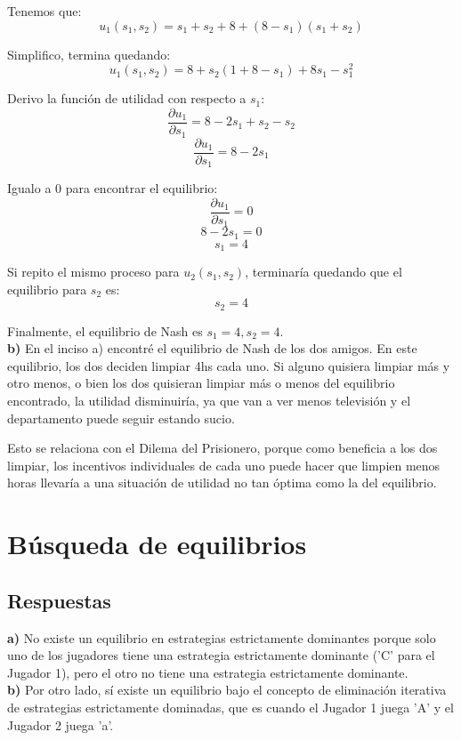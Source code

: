 \documentclass{article}
\begin{document}
                Tenemos que:
                \[u_{1}(s_{1},s_{2}) = s_{1}+s_{2}+8+(8-s_{1})(s_{1}+s_{2})\]

                Simplifico, termina quedando:
                \[u_{1}(s_{1},s_{2}) = 8 + s_{2}(1+8-s_{1})+8s_{1}-s^{2}_{1}\]

                Derivo la función de utilidad con respecto a $s_{1}$:
                \[\frac{\partial u_{1}}{\partial s_{1}} = 8 - 2s_{1} + s_{2}-s_{2}\]
                \[\frac{\partial u_{1}}{\partial s_{1}} = 8 - 2s_{1}\]

                Igualo a 0 para encontrar el equilibrio:
                \[\frac{\partial u_{1}}{\partial s_{1}} = 0\]
                \[8 - 2s_{1} = 0\]
                \[s_{1} = 4\]

                Si repito el mismo proceso para $u_{2}(s_{1},s_{2})$, terminaría quedando que el equilibrio para $s_{2}$ es:
                \[s_2 = 4\]

                Finalmente, el equilibrio de Nash es $s_{1} = 4, s_{2} = 4$.\\

            \textbf{b)} En el inciso a) encontré el equilibrio de Nash de los dos amigos. En este equilibrio, los dos deciden limpiar 4hs cada uno. Si alguno quisiera limpiar más y otro menos, o bien los dos quisieran limpiar más o menos del equilibrio encontrado, la utilidad disminuiría, ya que van a ver menos televisión y el departamento puede seguir estando sucio.

            Esto se relaciona con el Dilema del Prisionero, porque como beneficia a los dos limpiar, los incentivos individuales de cada uno puede hacer que limpien menos horas llevaría a una situación de utilidad no tan óptima como la del equilibrio.

    \section{Búsqueda de equilibrios}
        \subsection*{Respuestas}
            \textbf{a)} No existe un equilibrio en estrategias estrictamente dominantes porque solo uno de los jugadores tiene una estrategia estrictamente dominante ('C' para el Jugador 1), pero el otro no tiene una estrategia estrictamente dominante.\\
            \textbf{b)} Por otro lado, sí existe un equilibrio bajo el concepto de eliminación iterativa de estrategias estrictamente dominadas, que es cuando el Jugador 1 juega 'A' y el Jugador 2 juega 'a'.
        
\end{document}
